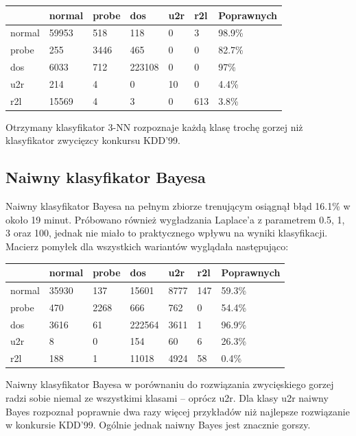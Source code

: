 \documentclass[a4paper, 12pt]{article}
\begin{document}
\begin{table}[H]
\centering
\begin{tabular}{ | l | l | l | l | l | l | l | } \hline
	& normal & probe & dos 	& u2r 	& r2l 	& Poprawnych	\\ \hline
normal 	& 59953 & 518 	& 118	& 0	& 3 	& 98.9\% 	\\ \hline
probe 	& 255 	& 3446 	& 465	& 0	& 0 	& 82.7\% 	\\ \hline
dos 	& 6033 	& 712 	& 223108& 0 	& 0 	& 97\% 		\\ \hline
u2r 	& 214 	& 4 	& 0	& 10	& 0	& 4.4\%		\\ \hline
r2l 	& 15569 & 4 	& 3	& 0	& 613	& 3.8\%		\\ \hline
\end{tabular} 
\end{table}

Otrzymany klasyfikator 3-NN rozpoznaje każdą klasę trochę gorzej niż klasyfikator zwycięzcy
konkursu KDD'99.

\subsection{Naiwny klasyfikator Bayesa}

Naiwny klasyfikator Bayesa na pełnym zbiorze trenującym osiągnął błąd 16.1\% w około 19
minut.
Próbowano również wygładzania Laplace'a z parametrem 0.5, 1, 3 oraz 100, jednak
nie miało to praktycznego wpływu na wyniki klasyfikacji. Macierz pomyłek dla wszystkich
wariantów wyglądała następująco:

\begin{table}[H]
\centering
\begin{tabular}{ | l | l | l | l | l | l | l | } \hline
	& normal & probe & dos 	& u2r 	& r2l 	& Poprawnych	\\ \hline
normal 	& 35930 & 137 	& 15601	& 8777	& 147 	& 59.3\% 	\\ \hline
probe 	& 470 	& 2268 	& 666	& 762	& 0 	& 54.4\% 	\\ \hline
dos 	& 3616 	& 61 	& 222564& 3611 	& 1 	& 96.9\% 	\\ \hline
u2r 	& 8 	& 0 	& 154	& 60	& 6	& 26.3\%	\\ \hline
r2l 	& 188 	& 1 	& 11018	& 4924	& 58	& 0.4\%		\\ \hline
\end{tabular} 
\end{table}

Naiwny klasyfikator Bayesa w porównaniu do rozwiązania zwycięskiego gorzej radzi sobie
niemal ze wszystkimi klasami -- oprócz u2r. Dla klasy u2r naiwny Bayes rozpoznał poprawnie
dwa razy więcej przykładów niż najlepsze rozwiązanie w konkursie KDD'99. 
Ogólnie jednak naiwny Bayes jest znacznie gorszy.
\end{document}
